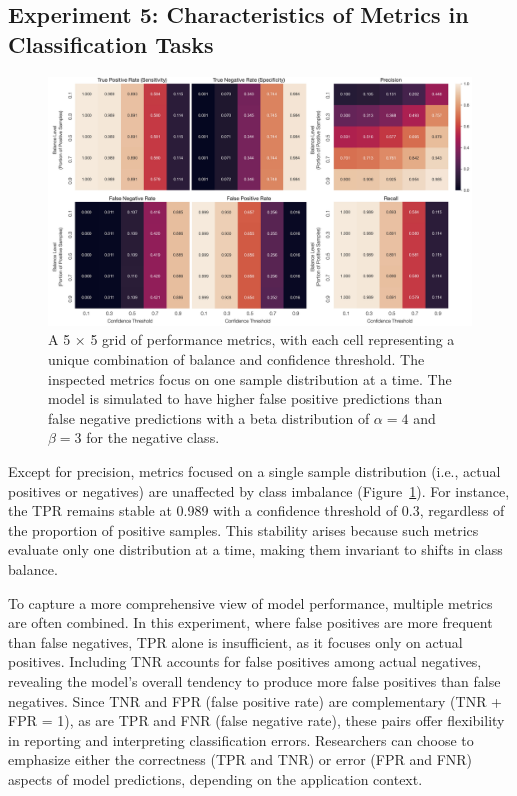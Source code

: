 \subsection{Experiment 5: Characteristics of Metrics in Classification Tasks}

\begin{figure}[H]
    \centering
    \includegraphics[width=1\textwidth]{fig_10.jpg}
    \caption{A 5 × 5 grid of performance metrics, with each cell representing a unique combination of balance and confidence threshold. The inspected metrics focus on one sample distribution at a time. The model is simulated to have higher false positive predictions than false negative predictions with a beta distribution of $\alpha=4$ and $\beta=3$ for the negative class.} 
    \label{fig:s5_1}
\end{figure}


Except for precision, metrics focused on a single sample distribution (i.e., actual positives or negatives) are unaffected by class imbalance (Figure~\ref{fig:s5_1}). For instance, the TPR remains stable at 0.989 with a confidence threshold of 0.3, regardless of the proportion of positive samples. This stability arises because such metrics evaluate only one distribution at a time, making them invariant to shifts in class balance.

To capture a more comprehensive view of model performance, multiple metrics are often combined. In this experiment, where false positives are more frequent than false negatives, TPR alone is insufficient, as it focuses only on actual positives. Including TNR accounts for false positives among actual negatives, revealing the model’s overall tendency to produce more false positives than false negatives. Since TNR and FPR (false positive rate) are complementary (TNR + FPR = 1), as are TPR and FNR (false negative rate), these pairs offer flexibility in reporting and interpreting classification errors. Researchers can choose to emphasize either the correctness (TPR and TNR) or error (FPR and FNR) aspects of model predictions, depending on the application context.

